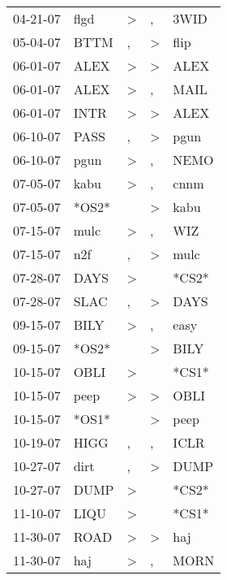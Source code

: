 \begin{supertabular}{lllll}
 04-21-07 &   flgd &     \textgreater &                , &   3WID \\
 05-04-07 &   BTTM &                , &     \textgreater &   flip \\
 06-01-07 &   ALEX &     \textgreater &     \textgreater &   ALEX \\
 06-01-07 &   ALEX &     \textgreater &                , &   MAIL \\
 06-01-07 &   INTR &     \textgreater &     \textgreater &   ALEX \\
 06-10-07 &   PASS &                , &     \textgreater &   pgun \\
 06-10-07 &   pgun &     \textgreater &                , &   NEMO \\
 07-05-07 &   kabu &     \textgreater &                , &   cnnm \\
 07-05-07 &  *OS2* &                  &     \textgreater &   kabu \\
 07-15-07 &   mulc &     \textgreater &                , &    WIZ \\
 07-15-07 &    n2f &                , &     \textgreater &   mulc \\
 07-28-07 &   DAYS &     \textgreater &                  &  *CS2* \\
 07-28-07 &   SLAC &                , &     \textgreater &   DAYS \\
 09-15-07 &   BILY &     \textgreater &                , &   easy \\
 09-15-07 &  *OS2* &                  &     \textgreater &   BILY \\
 10-15-07 &   OBLI &     \textgreater &                  &  *CS1* \\
 10-15-07 &   peep &     \textgreater &     \textgreater &   OBLI \\
 10-15-07 &  *OS1* &                  &     \textgreater &   peep \\
 10-19-07 &   HIGG &                , &                , &   ICLR \\
 10-27-07 &   dirt &                , &     \textgreater &   DUMP \\
 10-27-07 &   DUMP &     \textgreater &                  &  *CS2* \\
 11-10-07 &   LIQU &     \textgreater &                  &  *CS1* \\
 11-30-07 &   ROAD &     \textgreater &     \textgreater &    haj \\
 11-30-07 &    haj &     \textgreater &                , &   MORN \\

\end{supertabular}
